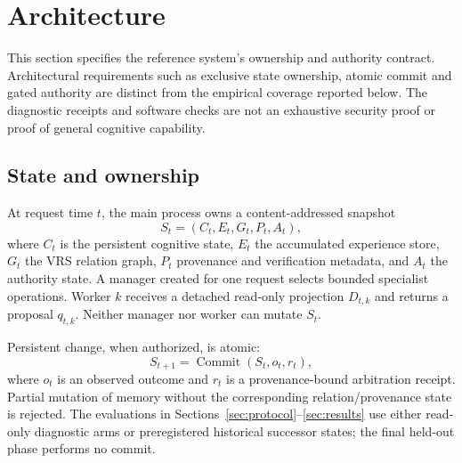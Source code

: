 \documentclass[11pt]{article}
\newcommand{\vrs}{VRS}
\begin{document}
\section{Architecture}

This section specifies the reference system's ownership and authority contract. Architectural requirements such as exclusive state ownership, atomic commit and gated authority are distinct from the empirical coverage reported below. The diagnostic receipts and software checks are not an exhaustive security proof or proof of general cognitive capability.

\subsection{State and ownership}

At request time $t$, the main process owns a content-addressed snapshot
\begin{equation}
  S_t = (C_t, E_t, G_t, P_t, A_t),
\end{equation}
where $C_t$ is the persistent cognitive state, $E_t$ the accumulated experience store, $G_t$ the \vrs{} relation graph, $P_t$ provenance and verification metadata, and $A_t$ the authority state.  A manager created for one request selects bounded specialist operations.  Worker $k$ receives a detached read-only projection $D_{t,k}$ and returns a proposal $q_{t,k}$.  Neither manager nor worker can mutate $S_t$.

Persistent change, when authorized, is atomic:
\begin{equation}
  S_{t+1} = \operatorname{Commit}(S_t, o_t, r_t),
\end{equation}
where $o_t$ is an observed outcome and $r_t$ is a provenance-bound arbitration receipt.  Partial mutation of memory without the corresponding relation/provenance state is rejected.  The evaluations in Sections~\ref{sec:protocol}--\ref{sec:results} use either read-only diagnostic arms or preregistered historical successor states; the final held-out phase performs no commit.
\end{document}
